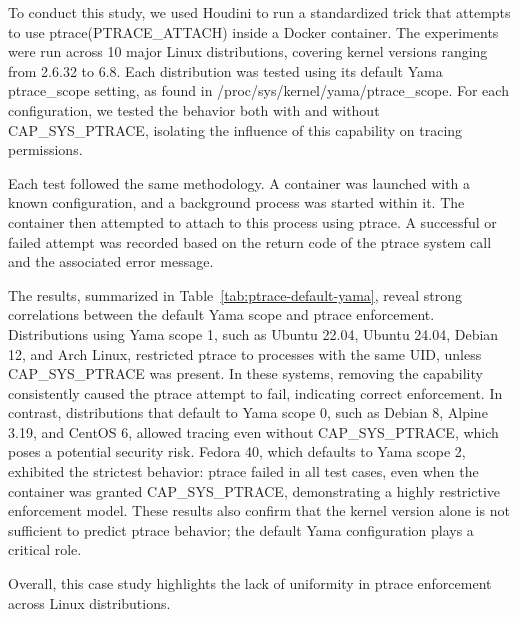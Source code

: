 \documentclass[12pt]{report}
\begin{document}
\begin{doublespace}
To conduct this study, we used Houdini to run a standardized trick that attempts to use ptrace(PTRACE\_ATTACH) inside a Docker container. The experiments were run across 10 major Linux distributions, covering kernel versions ranging from 2.6.32 to 6.8. Each distribution was tested using its default Yama ptrace\_scope setting, as found in /proc/sys/kernel/yama/ptrace\_scope. For each configuration, we tested the behavior both with and without CAP\_SYS\_PTRACE, isolating the influence of this capability on tracing permissions.

Each test followed the same methodology. A container was launched with a known configuration, and a background process was started within it. The container then attempted to attach to this process using ptrace. A successful or failed attempt was recorded based on the return code of the ptrace system call and the associated error message.

The results, summarized in Table~\ref{tab:ptrace-default-yama}, reveal strong correlations between the default Yama scope and ptrace enforcement. Distributions using Yama scope 1, such as Ubuntu 22.04, Ubuntu 24.04, Debian 12, and Arch Linux, restricted ptrace to processes with the same UID, unless CAP\_SYS\_PTRACE was present. In these systems, removing the capability consistently caused the ptrace attempt to fail, indicating correct enforcement. In contrast, distributions that default to Yama scope 0, such as Debian 8, Alpine 3.19, and CentOS 6, allowed tracing even without CAP\_SYS\_PTRACE, which poses a potential security risk. Fedora 40, which defaults to Yama scope 2, exhibited the strictest behavior: ptrace failed in all test cases, even when the container was granted CAP\_SYS\_PTRACE, demonstrating a highly restrictive enforcement model. These results also confirm that the kernel version alone is not sufficient to predict ptrace behavior; the default Yama configuration plays a critical role.

Overall, this case study highlights the lack of uniformity in ptrace enforcement across Linux distributions.


\end{doublespace}
\end{document}
